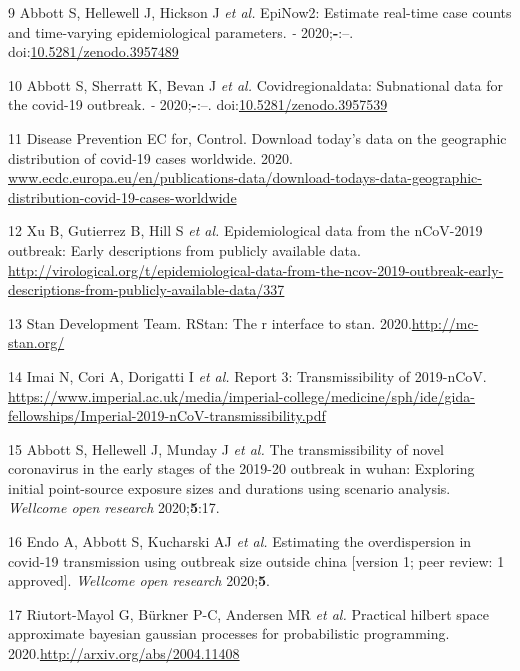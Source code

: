 \documentclass[
]{article}
\begin{document}
\leavevmode\hypertarget{ref-epinow2}{}%
9 Abbott S, Hellewell J, Hickson J \emph{et al.} EpiNow2: Estimate
real-time case counts and time-varying epidemiological parameters.
\emph{-} 2020;\textbf{-}:--.
doi:\href{https://doi.org/10.5281/zenodo.3957489}{10.5281/zenodo.3957489}

\leavevmode\hypertarget{ref-covidregionaldata}{}%
10 Abbott S, Sherratt K, Bevan J \emph{et al.} Covidregionaldata:
Subnational data for the covid-19 outbreak. \emph{-} 2020;\textbf{-}:--.
doi:\href{https://doi.org/10.5281/zenodo.3957539}{10.5281/zenodo.3957539}

\leavevmode\hypertarget{ref-ecdc_data}{}%
11 Disease Prevention EC for, Control. Download today's data on the
geographic distribution of covid-19 cases worldwide. 2020.
\url{www.ecdc.europa.eu/en/publications-data/download-todays-data-geographic-distribution-covid-19-cases-worldwide}

\leavevmode\hypertarget{ref-kraemer2020epidemiological}{}%
12 Xu B, Gutierrez B, Hill S \emph{et al.} Epidemiological data from the
nCoV-2019 outbreak: Early descriptions from publicly available data.
\url{http://virological.org/t/epidemiological-data-from-the-ncov-2019-outbreak-early-descriptions-from-publicly-available-data/337}

\leavevmode\hypertarget{ref-rstan}{}%
13 Stan Development Team. RStan: The r interface to stan.
2020.\url{http://mc-stan.org/}

\leavevmode\hypertarget{ref-Imai:webreport3}{}%
14 Imai N, Cori A, Dorigatti I \emph{et al.} Report 3: Transmissibility
of 2019-nCoV.
\url{https://www.imperial.ac.uk/media/imperial-college/medicine/sph/ide/gida-fellowships/Imperial-2019-nCoV-transmissibility.pdf}

\leavevmode\hypertarget{ref-Abbott:2020hj}{}%
15 Abbott S, Hellewell J, Munday J \emph{et al.} The transmissibility of
novel coronavirus in the early stages of the 2019-20 outbreak in wuhan:
Exploring initial point-source exposure sizes and durations using
scenario analysis. \emph{Wellcome open research} 2020;\textbf{5}:17.

\leavevmode\hypertarget{ref-10.12688ux2fwellcomeopenres.15842.1}{}%
16 Endo A, Abbott S, Kucharski AJ \emph{et al.} Estimating the
overdispersion in covid-19 transmission using outbreak size outside
china {[}version 1; peer review: 1 approved{]}. \emph{Wellcome open
research} 2020;\textbf{5}.

\leavevmode\hypertarget{ref-approxGP}{}%
17 Riutort-Mayol G, Bürkner P-C, Andersen MR \emph{et al.} Practical
hilbert space approximate bayesian gaussian processes for probabilistic
programming. 2020.\url{http://arxiv.org/abs/2004.11408}
\end{document}
